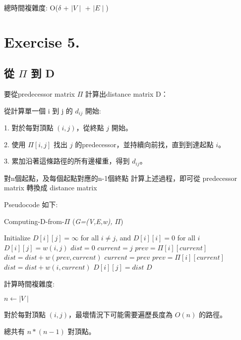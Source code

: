 \documentclass[UTF8, a4paper, 11pt]{report}
\begin{document}
總時間複雜度: O($\delta$ + $\mid V\mid$ + $\mid E\mid$)

\pagebreak

\section*{Exercise 5.}

\subsection*{從 $\Pi$ 到 D}

要從predecessor matrix $\Pi$ 計算出distance matrix D：

從計算單一個 i 到 j 的 $d_{ij}$ 開始:

1. 對於每對頂點 $(i,j)$，從終點 $j$ 開始。

2. 使用 $\Pi[i,j]$ 找出 $j$ 的predecessor，並持續向前找，直到到達起點 $i$。

3. 累加沿著這條路徑的所有邊權重，得到 $d_{ij}$。

對n個起點，及每個起點對應的n-1個終點 計算上述過程，即可從 predecessor matrix 轉換成 distance matrix

Pseudocode 如下:

\begin{algorithm}
    \caption{Computing-D-from-$\Pi$ (\textit{G=(V,E,w), $\Pi$})}
    \begin{algorithmic}[1]
        \State Initialize $D[i][j] = \infty$ for all $i \neq j$, and $D[i][i] = 0$ for all $i$
        \State $D[i][j] = w(i, j)$
        \EndFor
        \State $dist = 0$
        \State $current = j$
        \State $prev = \Pi[i][current]$
        \State $dist = dist + w(prev, current)$
        \State $current = prev$
        \State $prev = \Pi[i][current]$
        \EndWhile
        \State $dist = dist + w(i, current)$
        \State $D[i][j] = dist$
        \EndIf
        \EndFor
        \EndFor
        \State \Return $D$
    \end{algorithmic}
\end{algorithm}

計算時間複雜度:

$n \gets \mid V\mid$

對於每對頂點 $(i,j)$，最壞情況下可能需要遍歷長度為 $O(n)$ 的路徑。

總共有 $n * (n-1)$ 對頂點。
\end{document}
